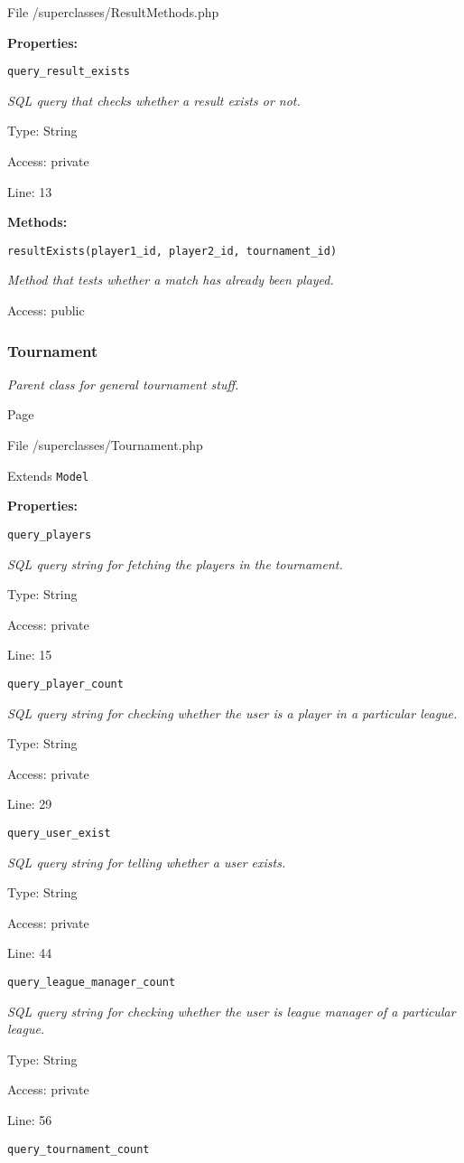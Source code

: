 File /superclasses/ResultMethods.php

\textbf{Properties:}

\texttt{query\_result\_exists}

{\scriptsize
\textit{SQL query that checks whether a result exists or not.}

Type: String

Access: private

Line: 13

}
\textbf{Methods:}

\texttt{resultExists(player1\_id, player2\_id, tournament\_id)}

{\scriptsize
\textit{Method that tests whether a match has already been played.}

Access: public

}

\subsubsection{Tournament}
\textit{Parent class for general tournament stuff.}

Page \pageref{Tournament.php}

File /superclasses/Tournament.php

Extends \texttt{Model}

\textbf{Properties:}

\texttt{query\_players}

{\scriptsize
\textit{SQL query string for fetching the players in the tournament.}

Type: String

Access: private

Line: 15

}
\texttt{query\_player\_count}

{\scriptsize
\textit{SQL query string for checking whether the user is a player in a particular league.}

Type: String

Access: private

Line: 29

}
\texttt{query\_user\_exist}

{\scriptsize
\textit{SQL query string for telling whether a user exists.}

Type: String

Access: private

Line: 44

}
\texttt{query\_league\_manager\_count}

{\scriptsize
\textit{SQL query string for checking whether the user is league manager of a particular league.}

Type: String

Access: private

Line: 56

}
\texttt{query\_tournament\_count}

